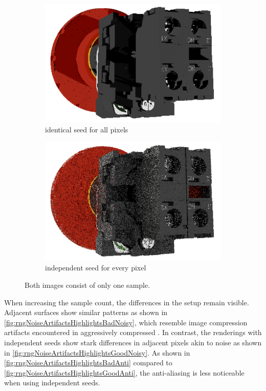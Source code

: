 \begin{figure}[H]
    \centering
    \begin{subfigure}[b]{0.45\textwidth}
        \includegraphics[width=\textwidth]{resources/single-sample-bad-seed.png}
        \caption{identical seed for all pixels}
        \label{fig:rngBadSeed}
    \end{subfigure}
    \hfill
    \begin{subfigure}[b]{0.45\textwidth}
        \includegraphics[width=\textwidth]{resources/single-sample-good-seed.png}
        \caption{independent seed for every pixel}
        \label{fig:rngGoodSeed}
    \end{subfigure}
    \caption{Both images consist of only one sample.}
    \label{fig:rngSeed}
\end{figure}

When increasing the sample count, the differences in the setup remain visible. Adjacent surfaces show similar patterns as shown in \autoref{fig:rngNoiseArtifactsHighlightsBadNoisy}, which resemble image compression artifacts encountered in aggressively compressed . In contrast, the renderings with independent seeds show stark differences in adjacent pixels akin to noise as shown in \autoref{fig:rngNoiseArtifactsHighlightsGoodNoisy}. As shown in \autoref{fig:rngNoiseArtifactsHighlightsBadAnti} compared to \autoref{fig:rngNoiseArtifactsHighlightsGoodAnti}, the anti-aliasing is less noticeable when using independent seeds.

